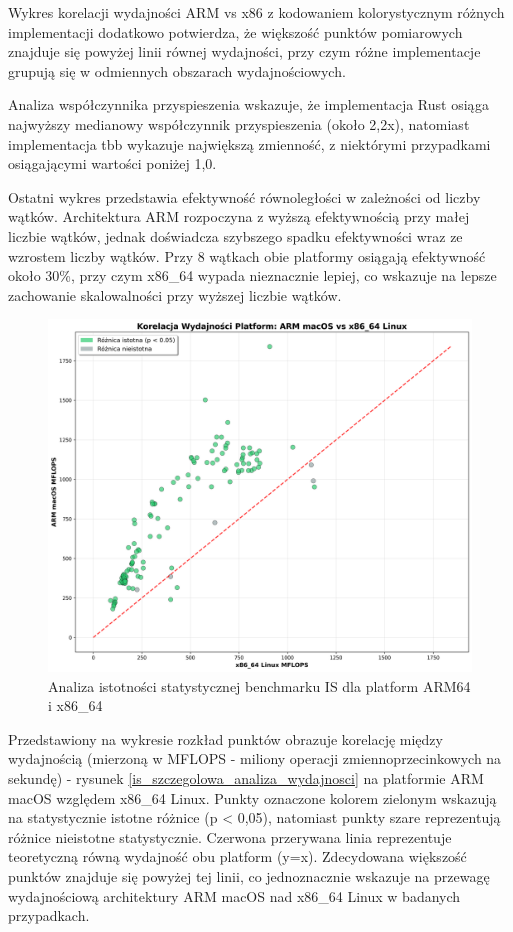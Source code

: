 Wykres korelacji wydajności ARM vs x86 z kodowaniem kolorystycznym różnych implementacji dodatkowo potwierdza, że większość punktów pomiarowych znajduje się powyżej linii równej wydajności, przy czym różne implementacje grupują się w odmiennych obszarach wydajnościowych.

Analiza współczynnika przyspieszenia wskazuje, że implementacja Rust osiąga najwyższy medianowy współczynnik przyspieszenia (około 2,2x), natomiast implementacja tbb wykazuje największą zmienność, z niektórymi przypadkami osiągającymi wartości poniżej 1,0.

Ostatni wykres przedstawia efektywność równoległości w zależności od liczby wątków. Architektura ARM rozpoczyna z wyższą efektywnością przy małej liczbie wątków, jednak doświadcza szybszego spadku efektywności wraz ze wzrostem liczby wątków. Przy 8 wątkach obie platformy osiągają efektywność około 30\%, przy czym x86\_64 wypada nieznacznie lepiej, co wskazuje na lepsze zachowanie skalowalności przy wyższej liczbie wątków.
\begin{figure}[H]
    \centering
    \includegraphics[width=\textwidth]{analiza/images/parallel/is/compare/is_analiza_istotnosci_statystycznej.png}
    \caption{Analiza istotności statystycznej benchmarku IS dla platform ARM64 i x86\_64}
    \label{is_analiza_istotnosci_statystycznej}
\end{figure}
Przedstawiony na wykresie rozkład punktów obrazuje korelację między wydajnością (mierzoną w MFLOPS - miliony operacji zmiennoprzecinkowych na sekundę) - rysunek \ref{is_szczegolowa_analiza_wydajnosci} na platformie ARM macOS względem x86\_64 Linux. Punkty oznaczone kolorem zielonym wskazują na statystycznie istotne różnice (p < 0,05), natomiast punkty szare reprezentują różnice nieistotne statystycznie. Czerwona przerywana linia reprezentuje teoretyczną równą wydajność obu platform (y=x). Zdecydowana większość punktów znajduje się powyżej tej linii, co jednoznacznie wskazuje na przewagę wydajnościową architektury ARM macOS nad x86\_64 Linux w badanych przypadkach.

